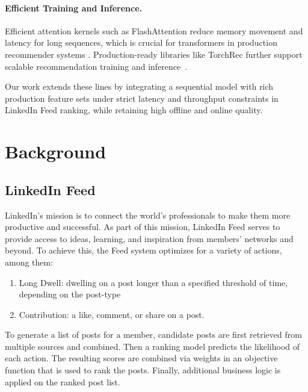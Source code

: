 \documentclass[sigconf]{acmart}
\begin{document}
\paragraph{Efficient Training and Inference.}
Efficient attention kernels such as FlashAttention reduce memory movement and latency for long sequences, which is crucial for transformers in production recommender systems \cite{dao2022flashattention}. Production-ready libraries like TorchRec further support scalable recommendation training and inference~\cite{ivanov2022torchrec}.

Our work extends these lines by integrating a sequential model with rich production feature sets under strict latency and throughput constraints in LinkedIn Feed ranking, while retaining high offline and online quality.


\section{Background}
\subsection{LinkedIn Feed}
LinkedIn's mission is to connect the world’s professionals to make them more productive and successful. As part of this mission, LinkedIn Feed serves to provide access to ideas, learning, and inspiration from members' networks and beyond. To achieve this, the Feed system optimizes for a variety of actions, among them:
\begin{enumerate}
    \item Long Dwell: dwelling on a post longer than a specified threshold of time, depending on the post-type
    \item Contribution: a like, comment, or share on a post.
\end{enumerate}
To generate a list of posts for a member, candidate posts are first retrieved from multiple sources \cite{ramanujam2025large,Ghike_Gupta_2016} and combined. Then a ranking model predicts the likelihood of each action. The resulting scores are combined via weights in an objective function that is used to rank the posts. Finally, additional business logic is applied on the ranked post list.
\end{document}
